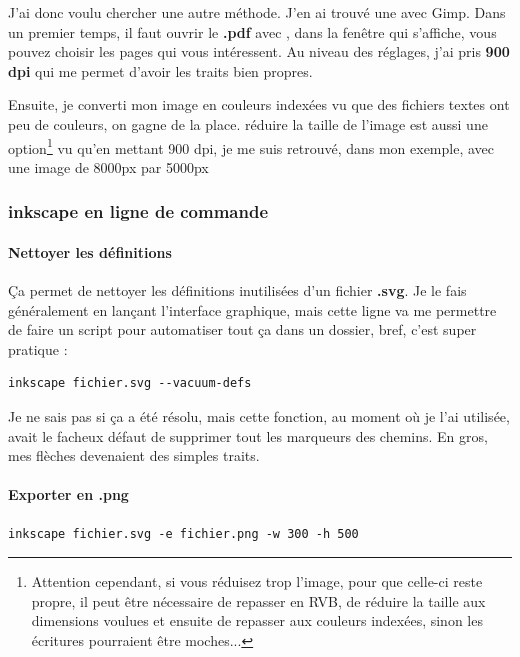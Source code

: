 \documentclass[a4paper,twoside]{article}
\begin{document}
J'ai donc voulu chercher une autre méthode. J'en ai trouvé une avec Gimp.
Dans un premier temps, il faut ouvrir le \textbf{.pdf} avec , dans la fenêtre qui s'affiche, vous pouvez choisir les pages qui vous intéressent. Au niveau des réglages, j'ai pris \textbf{900 dpi} qui me permet d'avoir les traits bien propres.

Ensuite, je converti mon image en couleurs indexées vu que des fichiers textes ont peu de couleurs, on gagne de la place.
réduire la taille de l'image est aussi une option\footnote{Attention cependant, si vous réduisez trop l'image, pour que celle-ci reste propre, il peut être nécessaire de repasser en RVB, de réduire la taille aux dimensions voulues et ensuite de repasser aux couleurs indexées, sinon les écritures pourraient être moches...} vu qu'en mettant 900 dpi, je me suis retrouvé, dans mon exemple, avec une image de 8000px par 5000px

\subsubsection{inkscape en ligne de commande}
\paragraph{Nettoyer les définitions}
Ça permet de nettoyer les définitions inutilisées d'un fichier \textbf{.svg}. Je le fais généralement en lançant l'interface graphique, mais cette ligne va me permettre de faire un script pour automatiser tout ça dans un dossier, bref, c'est super pratique :

\begin{verbatim}
inkscape fichier.svg --vacuum-defs
\end{verbatim}

\begin{attention}
Je ne sais pas si ça a été résolu, mais cette fonction, au moment où je l'ai utilisée, avait le facheux défaut de supprimer tout les marqueurs des chemins. En gros, mes flèches devenaient des simples traits.
\end{attention}


\paragraph{Exporter en .png}
\begin{verbatim}
inkscape fichier.svg -e fichier.png -w 300 -h 500
\end{verbatim}
\end{document}
